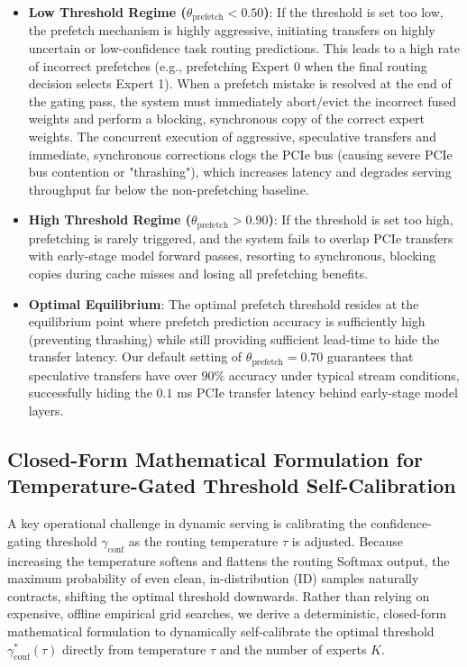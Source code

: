 \documentclass{article}
\theoremstyle{plain}
\theoremstyle{definition}
\theoremstyle{remark}
\begin{document}
\begin{itemize}
    \item \textbf{Low Threshold Regime ($\theta_{\text{prefetch}} < 0.50$)}: If the threshold is set too low, the prefetch mechanism is highly aggressive, initiating transfers on highly uncertain or low-confidence task routing predictions. This leads to a high rate of incorrect prefetches (e.g., prefetching Expert 0 when the final routing decision selects Expert 1). When a prefetch mistake is resolved at the end of the gating pass, the system must immediately abort/evict the incorrect fused weights and perform a blocking, synchronous copy of the correct expert weights. The concurrent execution of aggressive, speculative transfers and immediate, synchronous corrections clogs the PCIe bus (causing severe PCIe bus contention or "thrashing"), which increases latency and degrades serving throughput far below the non-prefetching baseline.
    \item \textbf{High Threshold Regime ($\theta_{\text{prefetch}} > 0.90$)}: If the threshold is set too high, prefetching is rarely triggered, and the system fails to overlap PCIe transfers with early-stage model forward passes, resorting to synchronous, blocking copies during cache misses and losing all prefetching benefits.
    \item \textbf{Optimal Equilibrium}: The optimal prefetch threshold resides at the equilibrium point where prefetch prediction accuracy is sufficiently high (preventing thrashing) while still providing sufficient lead-time to hide the transfer latency. Our default setting of $\theta_{\text{prefetch}} = 0.70$ guarantees that speculative transfers have over $90\%$ accuracy under typical stream conditions, successfully hiding the $0.1$ ms PCIe transfer latency behind early-stage model layers.
\end{itemize}

\subsection{Closed-Form Mathematical Formulation for Temperature-Gated Threshold Self-Calibration}
\label{app:self_calibration}
A key operational challenge in dynamic serving is calibrating the confidence-gating threshold $\gamma_{\text{conf}}$ as the routing temperature $\tau$ is adjusted. Because increasing the temperature softens and flattens the routing Softmax output, the maximum probability of even clean, in-distribution (ID) samples naturally contracts, shifting the optimal threshold downwards. Rather than relying on expensive, offline empirical grid searches, we derive a deterministic, closed-form mathematical formulation to dynamically self-calibrate the optimal threshold $\gamma_{\text{conf}}^*(\tau)$ directly from temperature $\tau$ and the number of experts $K$.
\end{document}
